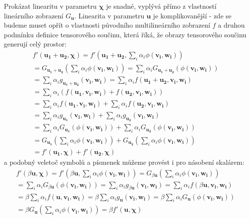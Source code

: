 \documentclass[a5paper,12pt]{amsbook}
\theoremstyle{definition}
\newcommand{\myvec}[1]{\mathbf{#1}}
\begin{document}
Prokázat linearitu v parametru $\myvec{\chi}$ je snadné, vyplývá přímo z vlastností lineárního
zobrazení $G_{\myvec{u}}$. Linearita v parametru $\myvec{u}$ je komplikovanější - zde se budeme
muset opřít o vlastnosti původního multilineárního zobrazení $f$ a druhou podmínku definice
tensorového součinu, která říká, že obrazy tensorového součinu generují celý prostor:
\begin{equation*}
\begin{split}
f'(\myvec{u_1}+\myvec{u_2}, \myvec{\chi}) 
  = f'(\myvec{u_1}+\myvec{u_2}, \sum_{i}\alpha_i\phi(\myvec{v_i}, \myvec{w_i})) \\
= G_{\myvec{u_1} + \myvec{u_2}}(\sum_{i}\alpha_i\phi(\myvec{v_i}, \myvec{w_i}))
  = \sum_{i}\alpha_i G_{\myvec{u_1} + \myvec{u_2}}(\phi(\myvec{v_i}, \myvec{w_i})) \\
= \sum_{i}\alpha_i g_{\myvec{u_1} + \myvec{u_2}}(\myvec{v_i}, \myvec{w_i})
  = \sum_{i}\alpha_i f(\myvec{u_1} + \myvec{u_2}, \myvec{v_i}, \myvec{w_i}) \\
= \sum_{i}\alpha_i (f(\myvec{u_1}, \myvec{v_i}, \myvec{w_i}) + f(\myvec{u_2}, \myvec{v_i}, \myvec{w_i})) \\
= \sum_{i}\alpha_i f(\myvec{u_1}, \myvec{v_i}, \myvec{w_i}) 
  + \sum_{i}\alpha_i f(\myvec{u_2}, \myvec{v_i}, \myvec{w_i}) \\
= \sum_{i}\alpha_i g_{\myvec{u_1}}(\myvec{v_i}, \myvec{w_i}) 
  + \sum_{i}\alpha_i g_{\myvec{u_2}}(\myvec{v_i}, \myvec{w_i}) \\
= \sum_{i}\alpha_i G_{\myvec{u_1}}(\phi(\myvec{v_i}, \myvec{w_i})) 
  + \sum_{i}\alpha_i G_{\myvec{u_2}}(\phi(\myvec{v_i}, \myvec{w_i})) \\
= G_{\myvec{u_1}}(\sum_{i}\alpha_i\phi(\myvec{v_i}, \myvec{w_i})) 
  + G_{\myvec{u_2}}(\sum_{i}\alpha_i\phi(\myvec{v_i}, \myvec{w_i})) \\
= f'(\myvec{u_1}, \myvec{\chi}) + f'(\myvec{u_2}, \myvec{\chi})
\end{split}
\end{equation*}
a podobný veletoč symbolů a písmenek můžeme provést i pro násobení skalárem:
\begin{equation*}
\begin{split}
f'(\beta\myvec{u}, \myvec{\chi}) 
= f'(\beta\myvec{u}, \sum_{i}\alpha_i\phi(\myvec{v_i}, \myvec{w_i}))
= G_{\beta\myvec{u}}(\sum_{i}\alpha_i\phi(\myvec{v_i}, \myvec{w_i})) \\
= \sum_{i}\alpha_i G_{\beta\myvec{u}}(\phi(\myvec{v_i}, \myvec{w_i}))
= \sum_{i}\alpha_i g_{\beta\myvec{u}}(\myvec{v_i}, \myvec{w_i})
= \sum_{i}\alpha_i f(\beta\myvec{u}, \myvec{v_i}, \myvec{w_i}) \\
= \beta\sum_{i}\alpha_i f(\myvec{u}, \myvec{v_i}, \myvec{w_i})
= \beta\sum_{i}\alpha_i g_{\myvec{u}}(\myvec{v_i}, \myvec{w_i})
= \beta\sum_{i}\alpha_i G_{\myvec{u}}(\phi(\myvec{v_i}, \myvec{w_i})) \\
= \beta G_{\myvec{u}}(\sum_{i}\alpha_i\phi(\myvec{v_i}, \myvec{w_i}))
= \beta f'(\myvec{u}, \myvec{\chi})
\end{split}
\end{equation*}
\end{document}
